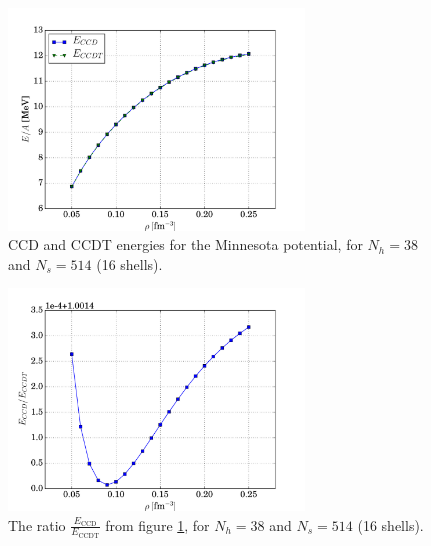 \documentclass[10pt,twoside]{report}
\begin{document}
	\begin{figure}
		\centering
		\captionsetup{width=.8\textwidth}
		\hspace{0.35cm}
		\includegraphics[width=0.7\textwidth]{Figures/MP_CCDT_COMPARISON_NH38.pdf}
		\caption{CCD and CCDT energies for the Minnesota potential, for $N_h=38$ and $N_s=514$ (16 shells).}
		\label{Results | fig | "MP CCD CCDT comparison, Nh=38, Nb=16"}
	\end{figure}
	
	\begin{figure}
		\centering
		\captionsetup{width=.8\textwidth}
		\hspace{0.35cm}
		\includegraphics[width=0.7\textwidth]{Figures/MP_CCDT_COMPARISON_NH38_RATIO.pdf}
		\caption{The ratio $\frac{E_{\text{CCD}}}{E_{\text{CCDT}}}$ from figure \ref{Results | fig | "MP CCD CCDT comparison, Nh=38, Nb=16"}, for $N_h=38$ and $N_s=514$ (16 shells).}
		\label{Results | fig | "MP CCD CCDT comparison ratio, Nh=38, Nb=16"}
	\end{figure}
	
\end{document}
